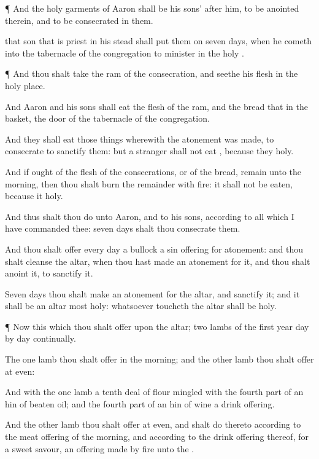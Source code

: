 {\par }{\PP {}¶ And the
holy
garments of
Aaron shall be his
sons’
after him, to be
anointed therein, and to be
consecrated in them.

 that
son that is
priest in his stead shall
put them on
seven
days, when he
cometh into the
tabernacle of the
congregation to
minister in the
holy
{}.


\par }{\PP {}¶ And thou shalt
take the
ram of the
consecration, and
seethe his
flesh in the
holy
place.

And
Aaron and his
sons shall
eat the
flesh of the
ram, and the
bread that
{} in the
basket,
{} the
door of the
tabernacle of the
congregation.

And they shall
eat those things wherewith the atonement was
made, to
consecrate
{} to
sanctify them: but a
stranger shall not
eat
{}, because they
{}
holy.

And if ought of the
flesh of the
consecrations, or of the
bread,
remain unto the
morning, then thou shalt
burn the
remainder with
fire: it shall not be
eaten, because it
{}
holy.

And thus shalt thou
do unto
Aaron, and to his
sons, according to all
{} which I have
commanded thee:
seven
days shalt thou
consecrate them.

And thou shalt
offer every
day a
bullock
{} a sin
offering for
atonement: and thou shalt
cleanse the
altar, when thou hast made an
atonement for it, and thou shalt
anoint it, to
sanctify it.

Seven
days thou shalt make an
atonement for the
altar, and
sanctify it; and it shall be an
altar most
holy: whatsoever
toucheth the
altar shall be
holy.


\par }{\PP {}¶ Now this
{} which thou shalt
offer upon the
altar;
two
lambs of the
first
year
day by
day
continually.

The
one
lamb thou shalt
offer in the
morning; and the
other
lamb thou shalt
offer at
even:

And with the
one
lamb a
tenth deal of
flour
mingled with the fourth
part of an
hin of
beaten
oil; and the fourth
part of an
hin of
wine
{} a drink
offering.

And the
other
lamb thou shalt
offer at
even, and shalt
do thereto according to the meat
offering of the
morning, and according to the drink
offering thereof, for a
sweet
savour, an offering made by
fire unto the
{}.

}
